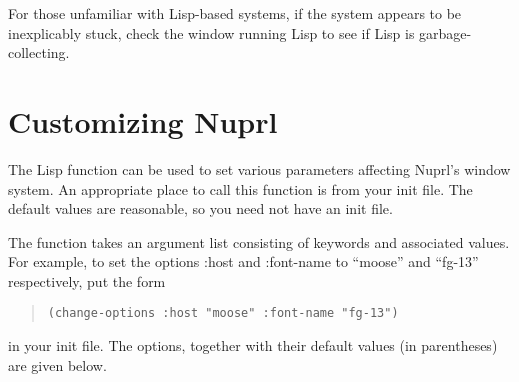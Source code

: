 For those unfamiliar with Lisp-based systems, if the system appears to be
inexplicably stuck, check the window running Lisp to see if Lisp is
garbage-collecting.



\section{Customizing Nuprl}

The Lisp function  can be used to set various
parameters affecting Nuprl's window system.  An appropriate place to call
this function is from your init file.  The default values are reasonable,
so you need not have an init file.

The  function takes an argument list consisting of
keywords and associated values.  For example, to set the options :host and
:font-name to ``moose'' and ``fg-13'' respectively, put the form
\begin{quote}
\tt  (change-options :host "moose" :font-name "fg-13")
\end{quote}
in your init file.  The options, together with their default
values (in parentheses) are given below.
